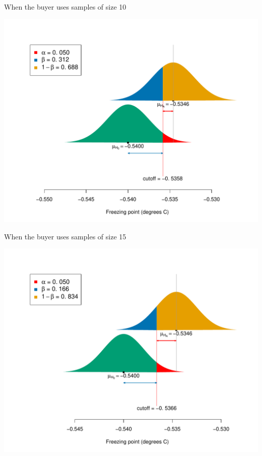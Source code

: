 \documentclass[handout]{beamer}\usepackage[]{graphicx}\usepackage[]{color}
\newenvironment{knitrout}{}{} %
\begin{document}
\begin{frame}[fragile]{When the buyer uses samples of size 10}
\begin{knitrout}\scriptsize
{}\color{fgcolor}

{\centering \includegraphics[width=1\linewidth]{figure/unnamed-chunk-11-1} 

}



\end{knitrout}
\end{frame}

\begin{frame}[fragile]{When the buyer uses samples of size 15}
\begin{knitrout}\scriptsize
{}\color{fgcolor}

{\centering \includegraphics[width=1\linewidth]{figure/unnamed-chunk-12-1} 

}



\end{knitrout}
\end{frame}
\end{document}
